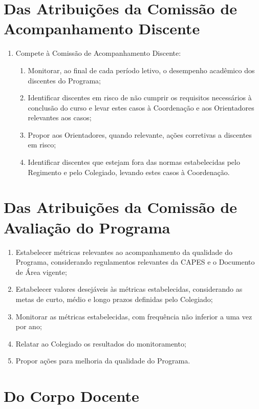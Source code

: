 \documentclass{article}
\begin{document}
\section{Das Atribuições da Comissão de Acompanhamento Discente}
\begin{enumerate}
	\item Compete à Comissão de Acompanhamento Discente:
	\begin{enumerate}[label=\Roman*]
		\item Monitorar, ao final de cada período letivo, o desempenho acadêmico dos discentes do Programa;
		\item Identificar discentes em risco de não cumprir os requisitos necessários à conclusão do curso e levar estes casos à Coordenação e aos Orientadores relevantes aos casos;
		\item Propor aos Orientadores, quando relevante, ações corretivas a discentes em risco;
		\item Identificar discentes que estejam fora das normas estabelecidas pelo Regimento e pelo Colegiado, levando estes casos à Coordenação.
	\end{enumerate}
\end{enumerate}

\section{Das Atribuições da Comissão de Avaliação do Programa}
\begin{enumerate}
	\begin{enumerate}[label=\Roman*]
		\item Estabelecer métricas relevantes ao acompanhamento da qualidade do Programa, considerando regulamentos relevantes da CAPES e o Documento de Área vigente;
		\item Estabelecer valores desejáveis às métricas estabelecidas, considerando as metas de curto, médio e longo prazos definidas pelo Colegiado;
		\item Monitorar as métricas estabelecidas, com frequência não inferior a uma vez por ano;
		\item Relatar ao Colegiado os resultados do monitoramento;
		\item Propor ações para melhoria da qualidade do Programa.
	\end{enumerate}
\end{enumerate}

\section{Do Corpo Docente}
\end{document}
